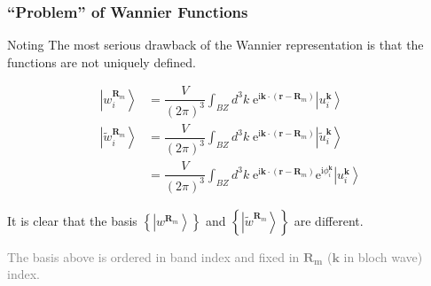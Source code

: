 \documentclass{beamer}
\begin{document}
  \begin{frame}
  \frametitle{``Problem'' of Wannier Functions}

  \begin{block}{Noting}
    The most serious drawback of the Wannier representation is that the functions are not uniquely defined. 
  \end{block}

  \begin{equation*}
    \begin{aligned}
      \left|w_i^{\mathbf{R}_m}\right\rangle &= \dfrac{V}{(2\pi)^3}\int_{BZ}d^3k\;\mathrm{e}^{\mathrm{i}\mathbf{k}\cdot(\mathbf{r}-\mathbf{R}_m)}\left|u_i^{\mathbf{k}}\right\rangle\\
      \left|\tilde{w}_i^{\mathbf{R}_m}\right\rangle &= \dfrac{V}{(2\pi)^3}\int_{BZ}d^3k\;\mathrm{e}^{\mathrm{i}\mathbf{k}\cdot(\mathbf{r}-\mathbf{R}_m)}\left|\tilde{u}_i^{\mathbf{k}}\right\rangle\\
      &= \dfrac{V}{(2\pi)^3}\int_{BZ}d^3k\;\mathrm{e}^{\mathrm{i}\mathbf{k}\cdot(\mathbf{r}-\mathbf{R}_m)}\mathrm{e}^{\mathrm{i}\phi_i^{\mathbf{k}}}\left|u_i^{\mathbf{k}}\right\rangle
    \end{aligned}
  \end{equation*}

  It is clear that the basis \(\left\{\left|w^{\mathbf{R}_m}\right\rangle\right\}\) and \(\left\{\left|\tilde{w}^{\mathbf{R}_m}\right\rangle\right\}\) are different.

    \textcolor{gray}{The basis above is ordered in band index and fixed in \(\mathbf{R_m}\) (\(\mathbf{k}\) in bloch wave) index.}
  \end{frame}
\end{document}
